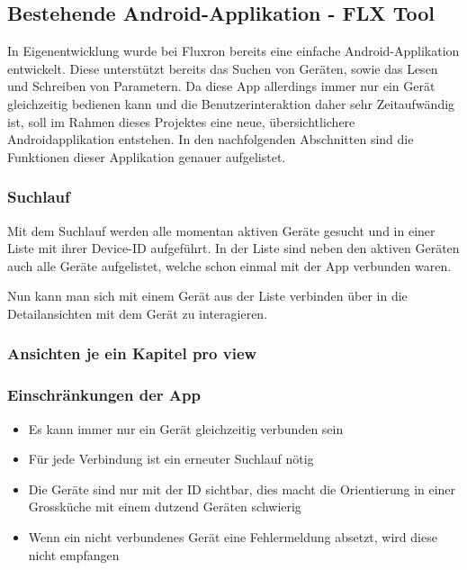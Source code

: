 \subsection{Bestehende Android-Applikation - FLX Tool }
\label{subsec:Bestehende Smartphone-Applikation}
In Eigenentwicklung wurde bei Fluxron bereits eine einfache Android-Applikation entwickelt. Diese unterstützt bereits das Suchen von Geräten, sowie das Lesen und Schreiben von Parametern. Da diese App allerdings immer nur ein Gerät gleichzeitig bedienen kann und die Benutzerinteraktion daher sehr Zeitaufwändig ist, soll im Rahmen dieses Projektes eine neue, übersichtlichere Androidapplikation entstehen. In den nachfolgenden Abschnitten sind die Funktionen dieser Applikation genauer aufgelistet.

\subsubsection{Suchlauf}
\label{subsubsec:Suchlauf}
Mit dem Suchlauf werden alle momentan aktiven Geräte gesucht und in einer Liste mit ihrer Device-ID aufgeführt. In der Liste sind neben den aktiven Geräten auch alle Geräte aufgelistet, welche schon einmal mit der App verbunden waren.

Nun kann man sich mit einem Gerät aus der Liste verbinden über in die Detailansichten mit dem Gerät zu interagieren.

\subsubsection{Ansichten je ein Kapitel pro view}
\label{subsubsec:Ansichten}

\subsubsection{Einschränkungen der App}
\label{subsubsec:Einschränkungen der App}
\begin{itemize}
\item Es kann immer nur ein Gerät gleichzeitig verbunden sein
\item Für jede Verbindung ist ein erneuter Suchlauf nötig
\item Die Geräte sind nur mit der ID sichtbar, dies macht die Orientierung in einer Grossküche mit einem dutzend Geräten schwierig
\item Wenn ein nicht verbundenes Gerät eine Fehlermeldung absetzt, wird diese nicht empfangen
\end{itemize}

